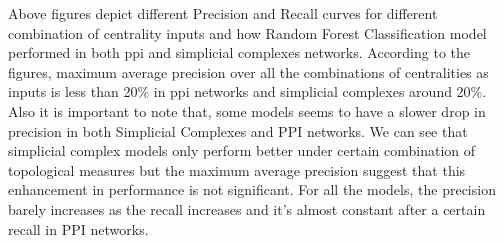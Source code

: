 \documentclass[9pt]{article}
\begin{document}
{Above figures depict different Precision and Recall curves for different combination of centrality inputs and how Random Forest Classification model performed in both ppi and simplicial complexes networks. According to the figures, maximum average precision over all the combinations of centralities as inputs is less than 20\% in ppi networks and simplicial complexes around 20\%. Also it is important to note that, some models seems to have a slower drop in precision in both Simplicial Complexes and PPI networks. We can see that simplicial complex models only perform better under certain combination of topological measures but the maximum average precision suggest that this enhancement in performance is not significant. For all the models, the precision barely increases as the recall increases and it’s almost constant after a certain recall in PPI networks.

}
\end{document}
